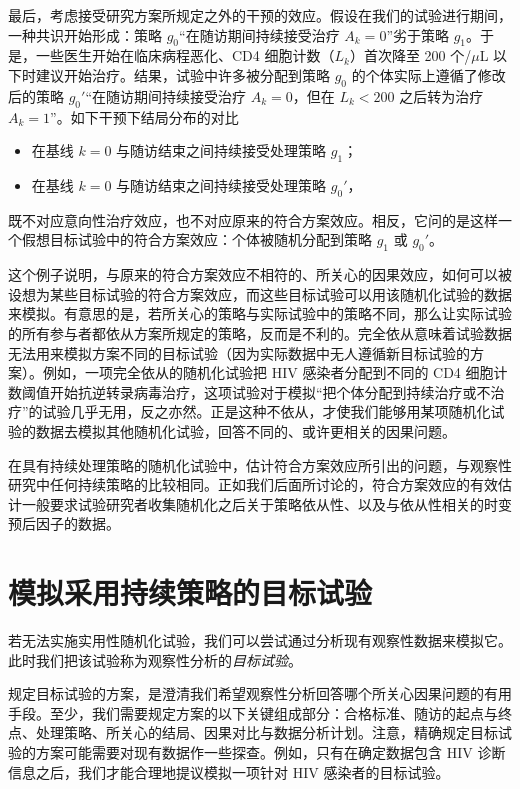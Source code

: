 最后，考虑接受研究方案所规定之外的干预的效应。假设在我们的试验进行期间，一种共识开始形成：策略 $g_0$“在随访期间持续接受治疗 $A_k=0$”劣于策略 $g_1$。于是，一些医生开始在临床病程恶化、CD4 细胞计数（$L_k$）首次降至 200 个/$\mu$L 以下时建议开始治疗。结果，试验中许多被分配到策略 $g_0$ 的个体实际上遵循了修改后的策略 $g_0'$“在随访期间持续接受治疗 $A_k=0$，但在 $L_k<200$ 之后转为治疗 $A_k=1$”。如下干预下结局分布的对比
\begin{itemize}
\item 在基线 $k=0$ 与随访结束之间持续接受处理策略 $g_1$；
\item 在基线 $k=0$ 与随访结束之间持续接受处理策略 $g_0'$，
\end{itemize}
既不对应意向性治疗效应，也不对应原来的符合方案效应。相反，它问的是这样一个假想目标试验中的符合方案效应：个体被随机分配到策略 $g_1$ 或 $g_0'$。

这个例子说明，与原来的符合方案效应不相符的、所关心的因果效应，如何可以被设想为某些目标试验的符合方案效应，而这些目标试验可以用该随机化试验的数据来模拟。有意思的是，若所关心的策略与实际试验中的策略不同，那么让实际试验的所有参与者都依从方案所规定的策略，反而是不利的。完全依从意味着试验数据无法用来模拟方案不同的目标试验（因为实际数据中无人遵循新目标试验的方案）。例如，一项完全依从的随机化试验把 HIV 感染者分配到不同的 CD4 细胞计数阈值开始抗逆转录病毒治疗，这项试验对于模拟“把个体分配到持续治疗或不治疗”的试验几乎无用，反之亦然。正是这种不依从，才使我们能够用某项随机化试验的数据去模拟其他随机化试验，回答不同的、或许更相关的因果问题。

在具有持续处理策略的随机化试验中，估计符合方案效应所引出的问题，与观察性研究中任何持续策略的比较相同。正如我们后面所讨论的，符合方案效应的有效估计一般要求试验研究者收集随机化之后关于策略依从性、以及与依从性相关的时变预后因子的数据。

\section{模拟采用持续策略的目标试验}

若无法实施实用性随机化试验，我们可以尝试通过分析现有观察性数据来模拟它。此时我们把该试验称为观察性分析的\emph{目标试验}。

规定目标试验的方案，是澄清我们希望观察性分析回答哪个所关心因果问题的有用手段。至少，我们需要规定方案的以下关键组成部分：合格标准、随访的起点与终点、处理策略、所关心的结局、因果对比与数据分析计划。注意，精确规定目标试验的方案可能需要对现有数据作一些探查。例如，只有在确定数据包含 HIV 诊断信息之后，我们才能合理地提议模拟一项针对 HIV 感染者的目标试验。

